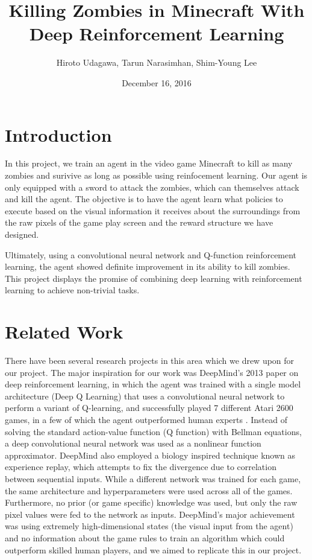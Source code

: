 \documentclass{article}
\title{Killing Zombies in Minecraft With Deep Reinforcement Learning}
\author{Hiroto Udagawa, Tarun Narasimhan, Shim-Young Lee}
\date{December 16, 2016}
\begin{document}
\maketitle

\begin{multicols}{2}

\section{Introduction}

In this project, we train an agent in the video game Minecraft to kill as many zombies and surivive as long as possible using reinfocement learning. Our agent is only equipped with a sword to attack the zombies, which can themselves attack and kill the agent. The objective is to have the agent learn what policies to execute based on the visual information it receives about the surroundings from the raw pixels of the game play screen and the reward structure we have designed.

Ultimately, using a convolutional neural network and Q-function reinforcement learning, the agent showed definite improvement in its ability to kill zombies. This project displays the promise of combining deep learning with reinforcement learning to achieve non-trivial tasks.

\section{Related Work}

There have been several research projects in this area which we drew upon for our project.
The major inspiration for our work was DeepMind's 2013 paper on deep reinforcement learning, in which the agent was trained with a single model architecture (Deep Q Learning) that uses a convolutional neural network to perform a variant of Q-learning, and successfully played 7 different Atari 2600 games, in a few of which the agent outperformed human experts \cite{deepMind}.
Instead of solving the standard action-value function (Q function) with Bellman equations, a deep convolutional neural network was used as a nonlinear function approximator. DeepMind also employed a biology inspired technique known as experience replay, which attempts to fix the divergence due to correlation between sequential inputs.
While a different network was trained for each game, the same architecture and hyperparameters were used across all of the games.
Furthermore, no prior (or game specific) knowledge was used, but only the raw pixel values were fed to the network as inputs.
DeepMind's major achievement was using extremely high-dimensional states (the visual input from the agent) and no information about the game rules to train an algorithm which could outperform skilled human players, and we aimed to replicate this in our project.


\end{multicols}
\end{document}
